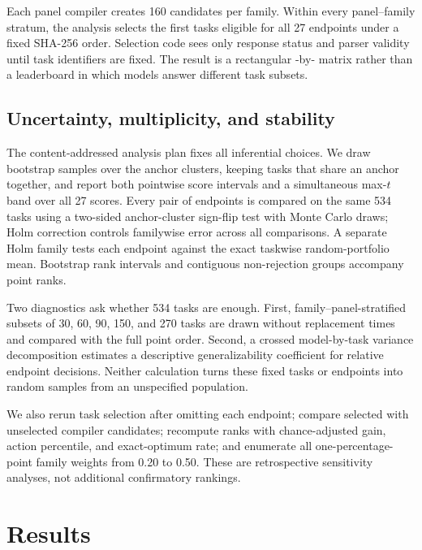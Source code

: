 \documentclass{article}
\begin{document}
Each panel compiler creates 160 candidates per family. Within every panel--family stratum, the
analysis selects the first \FBTasksPerPanelFamily{} tasks eligible for all 27 endpoints under a fixed
SHA-256 order. Selection code sees only response status and parser validity until task identifiers
are fixed. The result is a rectangular \FBModels{}-by-\FBTasks{} matrix rather than a leaderboard in
which models answer different task subsets.

\subsection{Uncertainty, multiplicity, and stability}

The content-addressed analysis plan fixes all inferential choices. We draw
\FBBootstrapResamples{} bootstrap samples over the \FBUniqueAnchors{} anchor clusters, keeping tasks
that share an anchor together, and report both pointwise score intervals and a simultaneous max-$t$
band over all 27 scores. Every pair of endpoints is compared on the same 534 tasks using a two-sided
anchor-cluster sign-flip test with \FBPermutationResamples{} Monte Carlo draws; Holm correction
controls familywise error across all \FBPairs{} comparisons. A separate Holm family tests each
endpoint against the exact taskwise random-portfolio mean. Bootstrap rank intervals and contiguous
non-rejection groups accompany point ranks.

Two diagnostics ask whether 534 tasks are enough. First, family--panel-stratified subsets of 30,
60, 90, 150, and 270 tasks are drawn without replacement \FBStabilityReplicates{} times and compared
with the full point order. Second, a crossed model-by-task variance decomposition estimates a
descriptive generalizability coefficient for relative endpoint decisions. Neither calculation turns
these fixed tasks or endpoints into random samples from an unspecified population.

We also rerun task selection after omitting each endpoint; compare selected with unselected compiler
candidates; recompute ranks with chance-adjusted gain, action percentile, and exact-optimum rate; and
enumerate all one-percentage-point family weights from 0.20 to 0.50. These are retrospective
sensitivity analyses, not additional confirmatory rankings.

\section{Results}
\label{sec:results}
\end{document}
